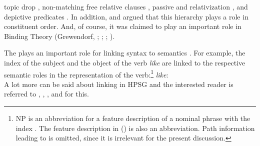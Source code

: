 \documentclass[output=paper
	        ,collection
	        ,collectionchapter
 	        ,biblatex
                ,babelshorthands
                ,newtxmath
                ,draftmode
                ,colorlinks, citecolor=brown
]{langscibook}
\begin{document}
topic drop \citep{Fries88b},
non-matching free relative clauses 
\parencites[Section~3]{Bausewein90}[]{Pittner95b}[--62]{Mueller99b}, 
passive and relativization \citep[, 68]{KC77a}, and
depictive predicates \citep[Section~2]{Mueller2008a}.
In addition, \citet{Pullum77a} and \citet[]{ps} argued that this hierarchy plays a role in
constituent order.
And, of course, it was claimed to play an important role in Binding Theory 
(Grewendorf, \citeyear[]{Grewendorf83a}; \citeyear[]{Grewendorf85a}; \citeyear[]{Grewendorf88a}; \citealp[Chapter~6]{ps2}).

The \argstl plays an important role for linking syntax to semantics . For example, the index of the
subject and the object of the verb \emph{like} are linked to the respective semantic roles in the
representation of the verb:\footnote{%
  NP is an abbreviation for a feature description of a nominal phrase with the index . The feature description in () is also an
  abbreviation. Path information leading to \cont is omitted, since it is irrelevant for the present discussion.%
}
\eas
\emph{like}:\\
\zs 
A lot more can be said about linking in HPSG and the interested reader is referred to
, , , and  for this.
\end{document}
